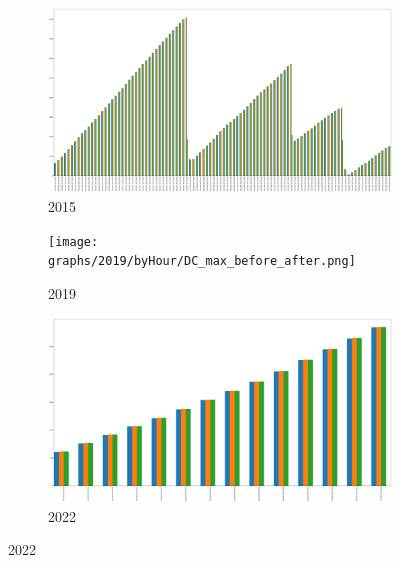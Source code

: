 \begin{figure}[h]
	\centering
	\caption{Before, after and daily DC maximum value}
	\begin{subfigure}{0.45\textwidth}
		\centering
		\includegraphics[width=\textwidth]{graphs/2015/byHour/DC_max_before_after.png}
		\caption{2015}
	\end{subfigure}
	\hfill
	\begin{subfigure}{0.45\textwidth}
		\centering
		\texttt{[image: graphs/2019/byHour/DC\_max\_before\_after.png]}
		\caption{2019}
	\end{subfigure}
	\hfill
	\begin{subfigure}{0.45\textwidth}
		\centering
		\includegraphics[width=\textwidth]{graphs/2022/DC_max_before_after.png}
		\caption{2022}
	\end{subfigure}
	\label{fig:daily_dc_after_before_max}
\end{figure}

